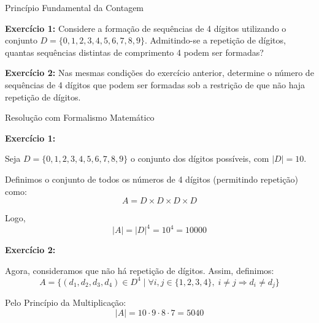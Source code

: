 \documentclass[9pt]{beamer}
\begin{document}
\begin{frame}{Princípio Fundamental da Contagem}

\textbf{Exercício 1:} Considere a formação de sequências de 4 dígitos utilizando o conjunto $D = \{0,1,2,3,4,5,6,7,8,9\}$. Admitindo-se a repetição de dígitos, quantas sequências distintas de comprimento 4 podem ser formadas?

\vspace{0.5cm}

\textbf{Exercício 2:} Nas mesmas condições do exercício anterior, determine o número de sequências de 4 dígitos que podem ser formadas sob a restrição de que não haja repetição de dígitos.

\end{frame}
\begin{frame}{Resolução com Formalismo Matemático}

\textbf{Exercício 1:}

Seja $D = \{0,1,2,3,4,5,6,7,8,9\}$ o conjunto dos dígitos possíveis, com $|D| = 10$.

Definimos o conjunto de todos os números de 4 dígitos (permitindo repetição) como:
\[
A = D \times D \times D \times D
\]

Logo,
\[
|A| = |D|^4 = 10^4 = 10000
\]

\vspace{0.4cm}

\textbf{Exercício 2:}

Agora, consideramos que não há repetição de dígitos. Assim, definimos:
\[
A = \{(d_1,d_2,d_3,d_4) \in D^4 \mid \forall i,j \in \{1,2,3,4\},\; i \neq j \Rightarrow d_i \neq d_j\}
\]

\vspace{0.3cm}

Pelo Princípio da Multiplicação:
\[
|A| = 10 \cdot 9 \cdot 8 \cdot 7 = 5040
\]


\end{frame}
\end{document}
